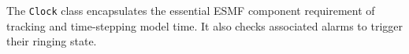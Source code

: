 
The {\tt Clock} class encapsulates the essential ESMF component requirement
of tracking and time-stepping model time.  It also checks associated alarms
to trigger their ringing state.
